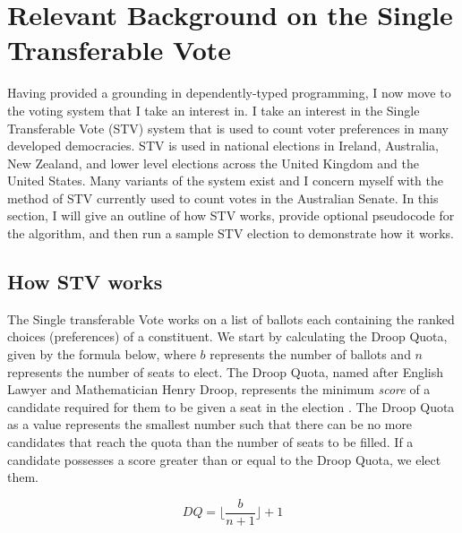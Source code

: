 \chapter{Relevant Background on the Single Transferable Vote}

Having provided a grounding in dependently-typed programming, I now move to the
voting system that I take an interest in. I take an interest in the Single
Transferable Vote (STV) system that is used to count voter preferences in many
developed democracies. STV is used in national elections in Ireland, Australia,
New Zealand, and lower level elections across the United Kingdom and the United
States. Many variants of the system exist and I concern myself with the method
of STV currently used to count votes in the Australian Senate. In this section,
I will give an outline of how STV works, provide optional pseudocode for the
algorithm, and then run a sample STV election to demonstrate how it works. 

\section{How STV works}

The Single transferable Vote works on a list of ballots each containing the
ranked choices (preferences) of a constituent. We start by calculating the Droop
Quota, given by the formula below, where $b$ represents the number of ballots
and $n$ represents the number of seats to elect. The Droop Quota, named after
English Lawyer and Mathematician Henry Droop, represents the minimum
\textit{score} of a candidate required for them to be given a seat in the
election \cite{henry_droop}. The Droop Quota as a value represents the smallest
number such that there can be no more candidates that reach the quota than the
number of seats to be filled. If a candidate possesses a score greater than or
equal to the Droop Quota, we elect them. 

$$
DQ = \lfloor\frac{b}{n + 1}\rfloor + 1
$$

